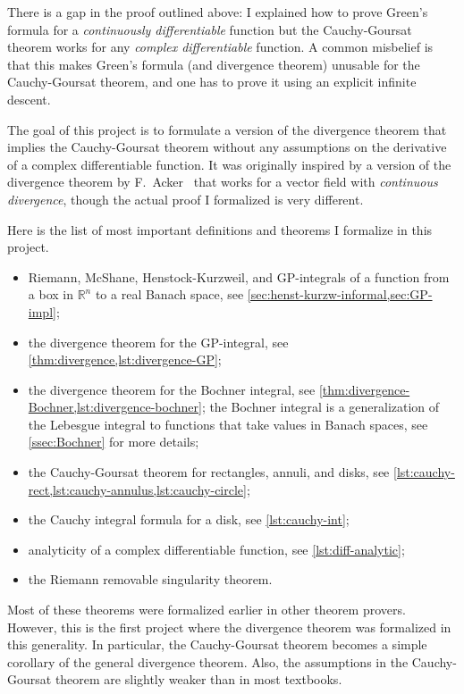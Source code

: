 \documentclass[a4paper, UKenglish,cleveref, autoref, thm-restate]{lipics-v2021}
\newcommand{\bbR}{\mathbb{R}}
\begin{document}
There is a gap in the proof outlined above: I explained how to prove
Green's formula for a \emph{continuously differentiable} function
but the Cauchy-Goursat theorem works for any \emph{complex
  differentiable} function. A common misbelief is that this makes
Green's formula (and divergence theorem) unusable for the Cauchy-Goursat
theorem, and one has to prove it using an explicit infinite descent.

The goal of this project is to formulate a version of the divergence
theorem that implies the Cauchy-Goursat theorem without any
assumptions on the derivative of a complex differentiable function. It
was originally inspired by a version of the divergence theorem by
F.~Acker~\cite{Acker1996} that works for a vector field with
\emph{continuous divergence}, though the actual proof I formalized is
very different.

Here is the list of most important definitions and theorems I
formalize in this project.
\begin{itemize}
\item Riemann, McShane, Henstock-Kurzweil, and GP-integrals of a
  function from a box in \(\bbR^{n}\) to a real Banach space, see
  \cref{sec:henst-kurzw-informal,sec:GP-impl};
\item the divergence theorem for the GP-integral, see
  \cref{thm:divergence,lst:divergence-GP};
\item the divergence theorem for the Bochner integral, see
  \cref{thm:divergence-Bochner,lst:divergence-bochner}; the Bochner
  integral is a generalization of the Lebesgue integral to functions
  that take values in Banach spaces, see \autoref{ssec:Bochner} for
  more details;
\item the Cauchy-Goursat theorem for rectangles, annuli, and disks,
  see \cref{lst:cauchy-rect,lst:cauchy-annulus,lst:cauchy-circle};
\item the Cauchy integral formula for a disk, see \cref{lst:cauchy-int};
\item analyticity of a complex differentiable function, see
  \cref{lst:diff-analytic};
\item the Riemann removable singularity theorem.
\end{itemize}

Most of these theorems were formalized earlier in other theorem
provers. However, this is the first project where the divergence
theorem was formalized in this generality. In particular, the
Cauchy-Goursat theorem becomes a simple corollary of the general
divergence theorem. Also, the assumptions in the Cauchy-Goursat
theorem are slightly weaker than in most textbooks.
\end{document}
